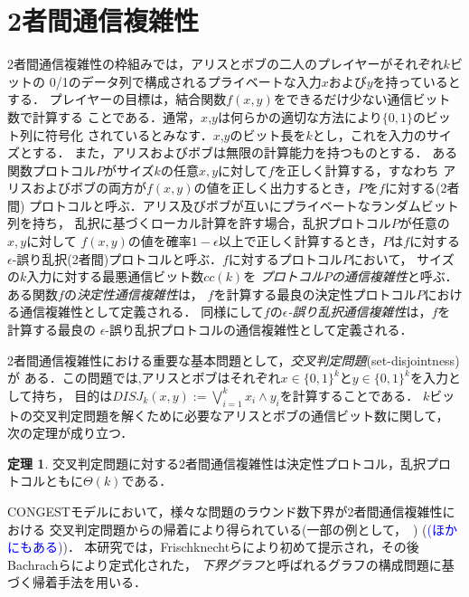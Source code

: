 \documentclass[12pt]{thesis}
\newcommand{\Izumi}[1]{\textcolor{blue}{(#1)}}
\newcommand{\CONGEST}{\textsf{CONGEST}}
\theoremstyle{definition}
\newtheorem{theorem}{定理}[chapter]
\begin{document}
\section{2者間通信複雑性}
2者間通信複雑性の枠組みでは，アリスとボブの二人のプレイヤーがそれぞれ$k$ビットの
0/1のデータ列で構成されるプライベートな入力$x$および$y$を持っているとする．
プレイヤーの目標は，結合関数$f(x,y)$をできるだけ少ない通信ビット数で計算する
ことである．通常，$x$,$y$は何らかの適切な方法により$\{0,1\}$のビット列に符号化
されているとみなす．$x$,$y$のビット長を$k$とし，これを入力のサイズとする．
また，アリスおよびボブは無限の計算能力を持つものとする．
ある関数プロトコル$P$がサイズ$k$の任意$x, y$に対して$f$を正しく計算する，すなわち
アリスおよびボブの両方が$f(x,y)$の値を正しく出力するとき，$P$を$f$に対する(2者間)
プロトコルと呼ぶ．アリス及びボブが互いにプライベートなランダムビット列を持ち，
乱択に基づくローカル計算を許す場合，乱択プロトコル$P$が任意の$x, y$に対して
$f(x,y)$の値を確率$1-\epsilon$以上で正しく計算するとき，$P$は$f$に対する
$\epsilon$-誤り乱択(2者間)プロトコルと呼ぶ．$f$に対するプロトコル$P$において，
サイズの$k$入力に対する最悪通信ビット数$\mathit{cc}(k)$を
\emph{プロトコル$P$の通信複雑性}と呼ぶ．ある関数$f$の\emph{決定性通信複雑性}は，
$f$を計算する最良の決定性プロトコル$P$における通信複雑性として定義される．
同様にして$f$の\emph{$\epsilon$-誤り乱択通信複雑性}は，$f$を計算する最良の
$\epsilon$-誤り乱択プロトコルの通信複雑性として定義される．

2者間通信複雑性における重要な基本問題として，\emph{交叉判定問題}(set-disjointness)が
ある．この問題では,アリスとボブはそれぞれ$x \in \{0, 1\}^{k}$と$y \in \{0, 1\}^{k}$を入力として持ち，
目的は$DISJ_{k} (x, y) :=\bigvee_{i = 1}^{k} x_{i} \land y_{i}$を計算することである．
$k$ビットの交叉判定問題を解くために必要なアリスとボブの通信ビット数に関して，
次の定理が成り立つ\cite{kalyanasundaram1992probabilistic}．
\begin{theorem} \label{thm:disjointness}
交叉判定問題に対する2者間通信複雑性は決定性プロトコル，乱択プロトコルともに$\Theta(k)$である．
\end{theorem}

{\CONGEST}モデルにおいて，様々な問題のラウンド数下界が2者間通信複雑性における
交叉判定問題からの帰着により得られている(一部の例として，~\cite{sarma2012distributed,fischer2018possibilities,czumaj2020detecting}) (\Izumi{ほかにもある})．
本研究では，Frischknechtら\cite{}により初めて提示され，その後Bachrachら\cite{}により定式化された，
\emph{下界グラフ}と呼ばれるグラフの構成問題に基づく帰着手法を用いる．
\end{document}
